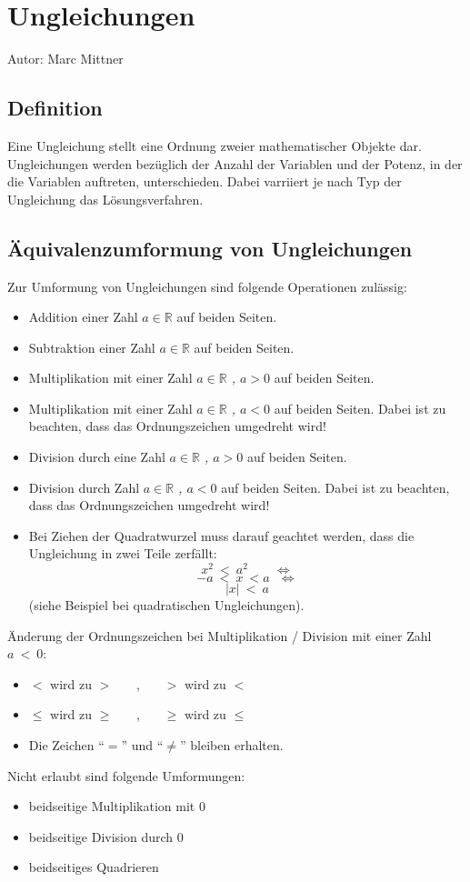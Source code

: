 \chapter{Ungleichungen}

Autor: Marc Mittner

\section{Definition}

Eine Ungleichung stellt eine Ordnung zweier mathematischer Objekte dar. Ungleichungen werden bezüglich der Anzahl der Variablen und der Potenz, in der die Variablen auftreten, unterschieden. Dabei varriiert je nach Typ der Ungleichung das Lösungsverfahren.

\section{Äquivalenzumformung von Ungleichungen}

Zur Umformung von Ungleichungen sind folgende Operationen zulässig:
\begin{itemize}
\item Addition einer Zahl \textit{$ a  \in \mathbb{R} $ } auf beiden Seiten.
\item Subtraktion einer Zahl \textit{$ a  \in \mathbb{R} $ } auf beiden Seiten.
\item {Multiplikation mit einer Zahl \textit{$ a \in \mathbb{R} $ , $ a > 0 $} auf beiden Seiten.}
\item {Multiplikation mit einer Zahl \textit{$ a \in \mathbb{R} $ , $ a < 0 $} auf beiden Seiten. Dabei ist zu beachten, dass das Ordnungszeichen umgedreht wird!}
\item {Division durch eine Zahl \textit{$ a \in \mathbb{R} $ , $ a > 0 $ } auf beiden Seiten.} 
\item {Division durch Zahl \textit{$ a \in \mathbb{R} $ , $ a < 0 $} auf beiden Seiten. Dabei ist zu beachten, dass das Ordnungszeichen umgedreht wird!}
\item Bei Ziehen der Quadratwurzel muss darauf geachtet werden, dass die Ungleichung in zwei Teile zerfällt:
\[x^2 \ < \ a^2 ~~~~~~~~~ \Leftrightarrow \]
\[ -a \ < \ x \ < a ~~~ \Leftrightarrow \]
\[ |x| \ < \ a \]
(siehe Beispiel bei quadratischen Ungleichungen).
\end{itemize}
Änderung der Ordnungszeichen bei Multiplikation / Division mit einer Zahl $ a \ < \ 0 $:
\begin{itemize}
\item $ < $ wird zu $ > $ ~~~,~~~ $ > $ wird zu $ < $
\item $ \leq $ wird zu $ \geq $ ~~~,~~~ $ \geq $ wird zu $ \leq $
\item Die Zeichen "`$ = $"' und "`$ \neq $"' bleiben erhalten.
\end{itemize}
Nicht erlaubt sind folgende Umformungen:
\begin{itemize}
\item beidseitige Multiplikation mit 0
\item beidseitige Division durch 0
\item beidseitiges Quadrieren 
\end{itemize}
